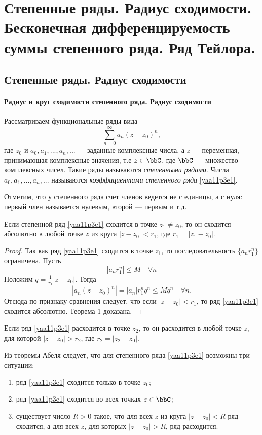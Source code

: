 \chapter{Степенные ряды. Радиус сходимости. Бесконечная дифференцируемость суммы степенного ряда. Ряд Тейлора.}
\section{Степенные ряды. Радиус сходимости}
\subsubsection{Радиус и круг сходимости степенного ряда. Радиус сходимости}
Рассматриваем функциональные ряды вида
\begin{equation}\label{yaa11p3e1}
\sum\limits_{n=0}^{\infty} a_n(z-z_0)^n,
\end{equation}
где $z_0$ и $a_0,a_1,...,a_n,...$ --- заданные комплексные числа, а $z$ --- переменная, принимающая комплексные значения, т.е $z\in\bbC$, где $\bbC$ --- множество комплексных чисел. Такие ряды называются \textit{степенными рядами}. Числа $a_0,a_1,...,a_n,...$ называются \textit{коэффициентами степенного ряда} \eqref{yaa11p3e1}.

Отметим, что у степенного ряда счет членов ведется не с единицы, а с нуля: первый член называется нулевым, второй --- первым и т.д.

\begin{thm}
Если степенной ряд \eqref{yaa11p3e1} сходится в точке $z_1\ne z_0$, то он сходится абсолютно в любой точке $z$ из круга $|z-z_0|<r_1$, где $r_1=|z_1-z_0|$.
\end{thm}

\begin{proof}
Так как ряд \eqref{yaa11p3e1} сходится в точке $z_1$, то последовательность $\{a_n r_1^n\}$ ограничена. Пусть
$$
|a_nr_1^n|\le M \quad \forall n
$$
Положим $q=\frac{1}{r_1}|z-z_0|$. Тогда
$$
|a_n(z-z_0)^n|=|a_n|r_1^nq^n\le Mq^n\quad \forall n.
$$
Отсюда по признаку сравнения следует, что если $|z-z_0|<r_1$, то ряд \eqref{yaa11p3e1} сходится абсолютно. Теорема 1 доказана.
\end{proof}

\begin{cons}
Если ряд \eqref{yaa11p3e1} расходится в точке $z_2$, то он расходится в любой точке $z$, для которой $|z-z_0|>r_2$, где $r_2=|z_2-z_0|$.
\end{cons}

Из теоремы Абеля следует, что для степенного ряда \eqref{yaa11p3e1} возможны три ситуации:
\begin{enumerate}
\item ряд \eqref{yaa11p3e1} сходится только в точке $z_0$;
\item ряд \eqref{yaa11p3e1} сходится во всех точках $z\in\bbC$;
\item существует число $R>0$ такое, что для всех $z$ из круга $|z-z_0|<R$ ряд сходится, а для всех $z$, для которых $|z-z_0|>R$, ряд расходится.
\end{enumerate}

